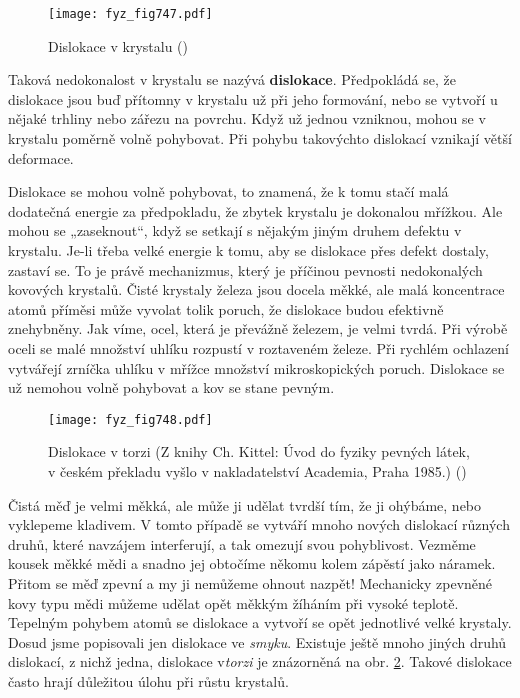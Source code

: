 {    \begin{figure}[ht!] %
      \centering
      \texttt{[image: fyz\_fig747.pdf]}
      \caption{Dislokace v krystalu
               (\cite[s.~554]{Feynman02})}
      \label{fyz_fig747}
    \end{figure}

    Taková nedokonalost v krystalu se nazývá \textbf{dislokace}. Předpokládá se, že dislokace jsou 
    buď přítomny v krystalu už při jeho formování, nebo se vytvoří u nějaké trhliny nebo zářezu na 
    povrchu. Když už jednou vzniknou, mohou se v krystalu poměrně volně pohybovat. Při pohybu 
    takovýchto dislokací vznikají větší deformace.
    
    Dislokace se mohou volně pohybovat, to znamená, že k tomu stačí malá dodatečná energie za 
    předpokladu, že zbytek krystalu je dokonalou mřížkou. Ale mohou se „zaseknout“, když se setkají 
    s nějakým jiným druhem defektu v krystalu. Je-li třeba velké energie k tomu, aby se dislokace 
    přes defekt dostaly, zastaví se. To je právě mechanizmus, který je příčinou pevnosti 
    nedokonalých kovových krystalů. Čisté krystaly železa jsou docela měkké, ale malá koncentrace 
    atomů příměsi může vyvolat tolik poruch, že dislokace budou efektivně znehybněny. Jak víme, 
    ocel, která je převážně železem, je velmi tvrdá. Při výrobě oceli se malé množství uhlíku 
    rozpustí v roztaveném železe. Při rychlém ochlazení vytvářejí zrníčka uhlíku v mřížce množství 
    mikroskopických poruch. Dislokace se už nemohou volně pohybovat a kov se stane pevným.
    
    \begin{figure}[ht!] %
      \centering
      \texttt{[image: fyz\_fig748.pdf]}
      \caption{Dislokace v torzi (Z knihy Ch. Kittel: Úvod do fyziky pevných látek, v českém 
               překladu vyšlo v nakladatelství Academia, Praha 1985.)
               (\cite[s.~554]{Feynman02})}
      \label{fyz_fig748}
    \end{figure}
    
    Čistá měď je velmi měkká, ale může ji udělat tvrdší tím, že ji ohýbáme, nebo vyklepeme 
    kladivem. V tomto případě se vytváří mnoho nových dislokací různých druhů, které navzájem 
    interferují, a tak omezují svou pohyblivost. Vezměme kousek měkké mědi a snadno jej obtočíme 
    někomu kolem zápěstí jako náramek. Přitom se měď zpevní a my ji nemůžeme ohnout nazpět! 
    Mechanicky zpevněné kovy typu mědi můžeme udělat opět měkkým žíháním při vysoké teplotě. 
    Tepelným pohybem atomů se  dislokace a vytvoří se opět jednotlivé velké krystaly. 
    Dosud jsme popisovali jen dislokace ve \emph{smyku}. Existuje ještě mnoho jiných druhů 
    dislokací, z nichž jedna, dislokace v\emph{torzi} je znázorněná na obr. \ref{fyz_fig748}. 
    Takové dislokace často hrají důležitou úlohu při růstu krystalů. 
    
}
